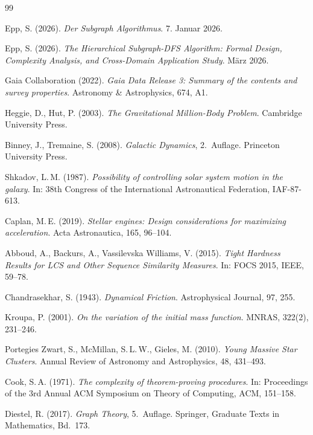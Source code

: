 ﻿\documentclass[a4paper,12pt]{report}
\theoremstyle{definition}
\begin{document}
\begin{thebibliography}{99}

Epp, S. (2026). \textit{Der Subgraph Algorithmus}. 7. Januar 2026.

Epp, S. (2026). \textit{The Hierarchical Subgraph-DFS Algorithm: Formal Design, Complexity Analysis, and Cross-Domain Application Study}. März 2026.

Gaia Collaboration (2022). \textit{Gaia Data Release 3: Summary of the contents and survey properties}. Astronomy \& Astrophysics, 674, A1.

Heggie, D., Hut, P. (2003). \textit{The Gravitational Million-Body Problem}. Cambridge University Press.

Binney, J., Tremaine, S. (2008). \textit{Galactic Dynamics}, 2.\ Auflage. Princeton University Press.

Shkadov, L.\,M. (1987). \textit{Possibility of controlling solar system motion in the galaxy}. In: 38th Congress of the International Astronautical Federation, IAF-87-613.

Caplan, M.\,E. (2019). \textit{Stellar engines: Design considerations for maximizing acceleration}. Acta Astronautica, 165, 96--104.

Abboud, A., Backurs, A., Vassilevska Williams, V. (2015). \textit{Tight Hardness Results for LCS and Other Sequence Similarity Measures}. In: FOCS 2015, IEEE, 59--78.

Chandrasekhar, S. (1943). \textit{Dynamical Friction}. Astrophysical Journal, 97, 255.

Kroupa, P. (2001). \textit{On the variation of the initial mass function}. MNRAS, 322(2), 231--246.

Portegies Zwart, S., McMillan, S.\,L.\,W., Gieles, M. (2010). \textit{Young Massive Star Clusters}. Annual Review of Astronomy and Astrophysics, 48, 431--493.

Cook, S.\,A. (1971). \textit{The complexity of theorem-proving procedures}. In: Proceedings of the 3rd Annual ACM Symposium on Theory of Computing, ACM, 151--158.


Diestel, R. (2017). \textit{Graph Theory}, 5.\ Auflage. Springer, Graduate Texts in Mathematics, Bd.~173.


\end{thebibliography}
\end{document}
